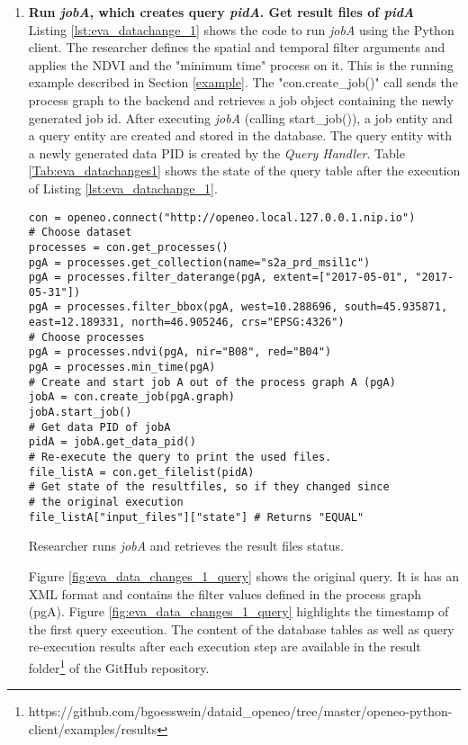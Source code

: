\documentclass[draft,final]{vutinfth} %
\newenvironment{code}{\captionsetup{type=listing}}{}
\begin{document}
\begin{enumerate}
	\item \textbf{Run \textit{jobA}, which creates query \textit{pidA}. Get result files of \textit{pidA}} \\
	Listing \ref{lst:eva_datachange_1} shows the code to run \textit{jobA} using the Python client. The researcher defines the spatial and temporal filter arguments and applies the NDVI and the "minimum time" process on it. This is the running example described in Section \ref{example}. The "con.create\_job()" call sends the process graph to the backend and retrieves a job object containing the newly generated job id. After executing \textit{jobA} (calling start\_job()), a job entity and a query entity are created and stored in the database. The query entity with a newly generated data PID is created by the \textit{Query Handler}. Table \ref{Tab:eva_datachanges1} shows the state of the query table after the execution of Listing \ref{lst:eva_datachange_1}.
	\begin{code}
		\begin{verbatim}
con = openeo.connect("http://openeo.local.127.0.0.1.nip.io")
# Choose dataset
processes = con.get_processes()
pgA = processes.get_collection(name="s2a_prd_msil1c")
pgA = processes.filter_daterange(pgA, extent=["2017-05-01", "2017-05-31"])
pgA = processes.filter_bbox(pgA, west=10.288696, south=45.935871, 
east=12.189331, north=46.905246, crs="EPSG:4326")
# Choose processes
pgA = processes.ndvi(pgA, nir="B08", red="B04")
pgA = processes.min_time(pgA)
# Create and start job A out of the process graph A (pgA)
jobA = con.create_job(pgA.graph)
jobA.start_job()
# Get data PID of jobA
pidA = jobA.get_data_pid()
# Re-execute the query to print the used files.
file_listA = con.get_filelist(pidA)
# Get state of the resultfiles, so if they changed since 
# the original execution 
file_listA["input_files"]["state"] # Returns "EQUAL"
		\end{verbatim}
		\caption{Researcher runs \textit{jobA} and retrieves the result files status.}
		\label{lst:eva_datachange_1}
	\end{code}

	Figure \ref{fig:eva_data_changes_1_query} shows the original query. It is has an XML format and contains the filter values defined in the process graph (pgA). Figure \ref{fig:eva_data_changes_1_query} highlights the timestamp of the first query execution. The content of the database tables as well as query re-execution results after each execution step are available in the result folder\footnote{https://github.com/bgoesswein/dataid\_openeo/tree/master/openeo-python-client/examples/results} of the GitHub repository. 
	

\end{enumerate}
\end{document}
